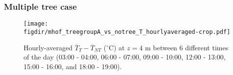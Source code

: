 %	
%	
%	

\newpage

\subsubsection{Multiple tree case}

	\begin{figure}[p]
	\centering
	\texttt{[image: \\figdir/mhof\_treegroupA\_vs\_notree\_T\_hourlyaveraged-crop.pdf]}
	\caption{Hourly-averaged $\overline{T}_{T}-\overline{T}_{\textit{NT}}$ ($^{\circ}$C) at $z=4$ m between 6 different times of the day (03:00 - 04:00, 06:00 - 07:00, 09:00 - 10:00, 12:00 - 13:00, 15:00 - 16:00, and 18:00 - 19:00).}
	\label{fig:mTdiff_muensterhof}
	\end{figure}
	
